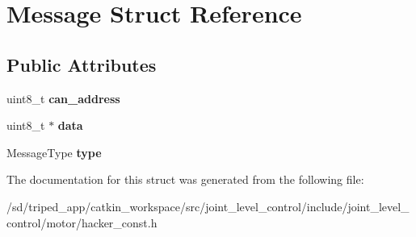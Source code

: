 \hypertarget{structMessage}{}\section{Message Struct Reference}
\label{structMessage}
\subsection*{Public Attributes}
\begin{DoxyCompactItemize}
\item 
\mbox{\label{structMessage_acc056126eaea6e24ec077efdb187c703}} 
uint8\+\_\+t {\bfseries can\+\_\+address}
\item 
\mbox{\label{structMessage_a858e7641c732b295c70e6fdb8db0fac9}} 
uint8\+\_\+t $\ast$ {\bfseries data}
\item 
\mbox{\label{structMessage_a6fc78df47d3755e088e7c658db565fc5}} 
Message\+Type {\bfseries type}
\end{DoxyCompactItemize}


The documentation for this struct was generated from the following file\+:\begin{DoxyCompactItemize}
\item 
/sd/triped\+\_\+app/catkin\+\_\+workspace/src/joint\+\_\+level\+\_\+control/include/joint\+\_\+level\+\_\+control/motor/hacker\+\_\+const.\+h\end{DoxyCompactItemize}
